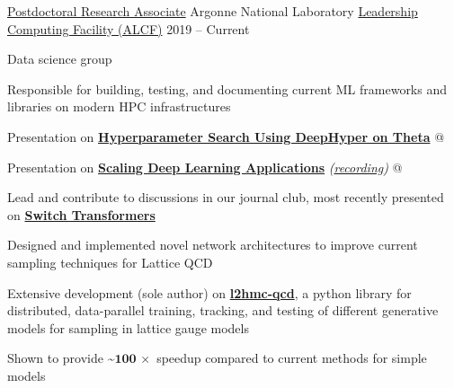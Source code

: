 \begin{cventries}
  \cventry
  {\href{https://www.alcf.anl.gov/about/people/sam-foreman}{\textcolor{awlink}{Postdoctoral Research Associate}}}
  {Argonne National Laboratory}
  {\href{https://www.alcf.anl.gov}{\textcolor{awesome}{Leadership Computing Facility (ALCF)}}}
  {2019 -- Current}
  {
    \begin{cvitems}
    \item {Data science group}
      \begin{cvsubitems}
      \item{Responsible for building, testing, and documenting current ML frameworks and libraries on modern HPC infrastructures}
      \item{Presentation on \href{https://bit.ly/DeepHyperSDL21}{\textbf{Hyperparameter Search Using DeepHyper on
              Theta}} @ \href{https://github.com/argonne-lcf/sdl_ai_workshop}{\emph{\color{awlink}{ALCF: Simulation, Data, and Learning
        Workshop}}}}
      \item{Presentation on \href{https://bit.ly/scaling_CPW21}{\textbf{Scaling Deep Learning Applications}}}
        \textit{(\href{https://youtu.be/ESbk-ESLhqk}{recording})} @
        \href{https://github.com/argonne-lcf/CompPerfWorkshop-2021}{\emph{\color{awlink}{2021 Computational Performance
        Workshop}}}
      \item{Lead and contribute to discussions in our journal club, most recently presented on
        \textbf{\href{https://anl.app.box.com/v/switch-transformers}{Switch Transformers}}}
      \end{cvsubitems}
    \item{Designed and implemented novel network architectures to improve current sampling techniques for Lattice QCD}
    \item{Extensive development (sole author) on
        {\href{https://www.github.com/saforem2/l2hmc-qcd}{\textbf{l2hmc-qcd}}}, a python library for
        distributed, data-parallel training, tracking, and testing of different generative models for sampling in
        lattice gauge models}
      \begin{cvsubitems}
  \item{Shown to provide \textbf{\textasciitilde\(\mathbf{100\,\times}\)} speedup compared to current methods for simple models}
      \end{cvsubitems}
    \end{cvitems}
  }


\end{cventries}
